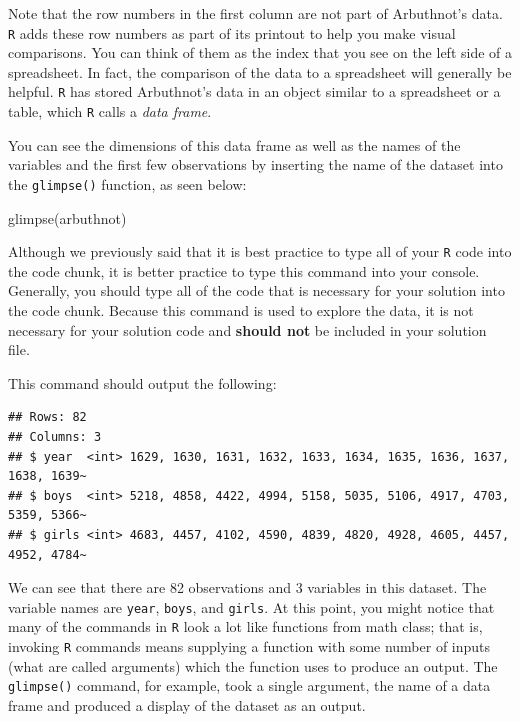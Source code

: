 \documentclass[
]{article}
\newenvironment{Shaded}{\begin{snugshade}}{\end{snugshade}}
\newcommand{\FunctionTok}[1]{\textcolor[rgb]{0.00,0.00,0.00}{#1}}
\newcommand{\NormalTok}[1]{#1}
\begin{document}
Note that the row numbers in the first column are not part of Arbuthnot's data. \texttt{R} adds these row numbers as part of its printout to help you make visual comparisons. You can think of them as the index that you see on the left side of a spreadsheet. In fact, the comparison of the data to a spreadsheet will generally be helpful. \texttt{R} has stored Arbuthnot's data in an object similar to a spreadsheet or a table, which \texttt{R} calls a \emph{data frame}.

You can see the dimensions of this data frame as well as the names of the variables and the first few observations by inserting the name of the dataset into the \texttt{glimpse()} function, as seen below:

\begin{Shaded}
\begin{Highlighting}[]
\FunctionTok{glimpse}\NormalTok{(arbuthnot)}
\end{Highlighting}
\end{Shaded}

Although we previously said that it is best practice to type all of your \texttt{R} code into the code chunk, it is better practice to type this command into your console. Generally, you should type all of the code that is necessary for your solution into the code chunk. Because this command is used to explore the data, it is not necessary for your solution code and \textbf{should not} be included in your solution file.

This command should output the following:

\begin{verbatim}
## Rows: 82
## Columns: 3
## $ year  <int> 1629, 1630, 1631, 1632, 1633, 1634, 1635, 1636, 1637, 1638, 1639~
## $ boys  <int> 5218, 4858, 4422, 4994, 5158, 5035, 5106, 4917, 4703, 5359, 5366~
## $ girls <int> 4683, 4457, 4102, 4590, 4839, 4820, 4928, 4605, 4457, 4952, 4784~
\end{verbatim}

We can see that there are 82 observations and 3 variables in this dataset. The variable names are \texttt{year}, \texttt{boys}, and \texttt{girls}. At this point, you might notice that many of the commands in \texttt{R} look a lot like functions from math class; that is, invoking \texttt{R} commands means supplying a function with some number of inputs (what are called arguments) which the function uses to produce an output. The \texttt{glimpse()} command, for example, took a single argument, the name of a data frame and produced a display of the dataset as an output.
\end{document}
